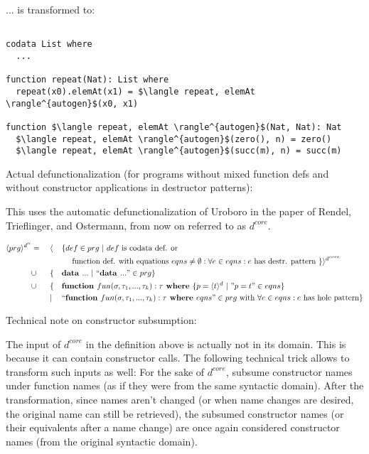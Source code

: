 \documentclass[11pt]{article} %
\begin{document}
... is transformed to:

\begin{lstlisting}[mathescape]

codata List where
  ...

function repeat(Nat): List where
  repeat(x0).elemAt(x1) = $\langle repeat, elemAt \rangle^{autogen}$(x0, x1)

function $\langle repeat, elemAt \rangle^{autogen}$(Nat, Nat): Nat
  $\langle repeat, elemAt \rangle^{autogen}$(zero(), n) = zero()
  $\langle repeat, elemAt \rangle^{autogen}$(succ(m), n) = succ(m)

\end{lstlisting}

Actual defunctionalization (for programs without mixed function defs and without constructor applications in destructor patterns):

This uses the automatic defunctionalization of Uroboro in the paper of Rendel, Trieflinger, and Ostermann, from now on referred to as $d^{core}$.

\begin{alignat*}{3}
\langle prg \rangle^{d''} & = ~&& \langle && \{ def \in prg ~ | ~ def \textrm{ is codata def. or} \\ & && &&\quad \textrm{ function def. with equations } eqns \neq \emptyset: \forall e \in eqns: e \textrm{ has destr. pattern } \} \rangle^{d^{core}} \\
& \cup && \{ && \textrm{\textbf{data }} ... ~ | ~ `` \textrm{\textbf{data }} ... " \in prg \} \\
& \cup && \{ && \textrm{\textbf{function }} fun(\sigma, \tau_1, ..., \tau_k): \tau \textrm{\textbf{ where }} \{ p = \langle t \rangle^d ~ | ~ "p = t" \in eqns \} \\
& && | && `` \textrm{\textbf{function }} fun(\sigma, \tau_1, ..., \tau_k): \tau \textrm{\textbf{ where }} eqns " \in prg \textrm{ with } \forall e \in eqns: e \textrm{ has hole pattern}\} 
\end{alignat*}

Technical note on constructor subsumption:

The input of $d^{core}$ in the definition above is actually not in its domain. This is because it can contain constructor calls. The following technical trick allows to transform such inputs as well: For the sake of $d^{core}$, subsume constructor names under function names (as if they were from the same syntactic domain). After the transformation, since names aren't changed (or when name changes are desired, the original name can still be retrieved), the subsumed constructor names (or their equivalents after a name change) are once again considered constructor names (from the original syntactic domain).
\end{document}
